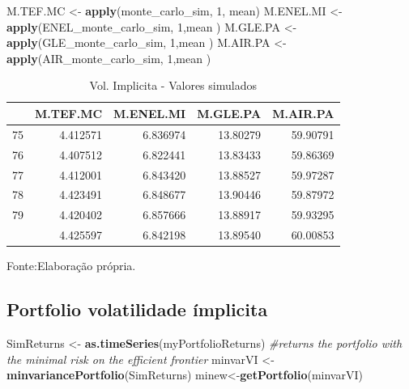 \documentclass[
  12pt,
  a4paper,
  openany]{book}
\newenvironment{Shaded}{\begin{snugshade}}{\end{snugshade}}
\newcommand{\CommentTok}[1]{\textcolor[rgb]{0.56,0.35,0.01}{\textit{#1}}}
\newcommand{\DecValTok}[1]{\textcolor[rgb]{0.00,0.00,0.81}{#1}}
\newcommand{\KeywordTok}[1]{\textcolor[rgb]{0.13,0.29,0.53}{\textbf{#1}}}
\newcommand{\NormalTok}[1]{#1}
\newcommand{\StringTok}[1]{\textcolor[rgb]{0.31,0.60,0.02}{#1}}
\begin{document}
\scriptsize

\begin{Shaded}
\begin{Highlighting}[]
\NormalTok{M.TEF.MC \textless{}{-}}\StringTok{ }\KeywordTok{apply}\NormalTok{(monte\_carlo\_sim, }\DecValTok{1}\NormalTok{, mean)}
\NormalTok{M.ENEL.MI \textless{}{-}}\StringTok{ }\KeywordTok{apply}\NormalTok{(ENEL\_monte\_carlo\_sim, }\DecValTok{1}\NormalTok{,mean )}
\NormalTok{M.GLE.PA \textless{}{-}}\StringTok{ }\KeywordTok{apply}\NormalTok{(GLE\_monte\_carlo\_sim, }\DecValTok{1}\NormalTok{,mean )}
\NormalTok{M.AIR.PA \textless{}{-}}\StringTok{ }\KeywordTok{apply}\NormalTok{(AIR\_monte\_carlo\_sim, }\DecValTok{1}\NormalTok{,mean )}
\end{Highlighting}
\end{Shaded}

\normalsize
\begin{table}[!h]

\caption{\label{tab:unnamed-chunk-52}Vol. Implicita - Valores simulados}
\centering
\begin{tabular}[t]{lrrrr}
\toprule
  & M.TEF.MC & M.ENEL.MI & M.GLE.PA & M.AIR.PA\\
\midrule
75 & 4.412571 & 6.836974 & 13.80279 & 59.90791\\
76 & 4.407512 & 6.822441 & 13.83433 & 59.86369\\
77 & 4.412001 & 6.843420 & 13.88527 & 59.97287\\
78 & 4.423491 & 6.848677 & 13.90446 & 59.87972\\
79 & 4.420402 & 6.857666 & 13.88917 & 59.93295\\
\addlinespace
80 & 4.425597 & 6.842198 & 13.89540 & 60.00853\\
\bottomrule
\end{tabular}
\end{table}
\FloatBarrier
\centering

Fonte:Elaboração própria.

\justifying
\bigskip

\hypertarget{portfolio-volatilidade-uxedmplicita}{%
\subsection{Portfolio volatilidade ímplicita}\label{portfolio-volatilidade-uxedmplicita}}

\scriptsize

\begin{Shaded}
\begin{Highlighting}[]
\NormalTok{SimReturns \textless{}{-}}\StringTok{ }\KeywordTok{as.timeSeries}\NormalTok{(myPortfolioReturns)}
\CommentTok{\#returns the portfolio with the minimal risk on the efficient frontier}
\NormalTok{minvarVI \textless{}{-}}\StringTok{ }\KeywordTok{minvariancePortfolio}\NormalTok{(SimReturns) }
\NormalTok{minew\textless{}{-}}\KeywordTok{getPortfolio}\NormalTok{(minvarVI)}
\end{Highlighting}
\end{Shaded}
\end{document}
